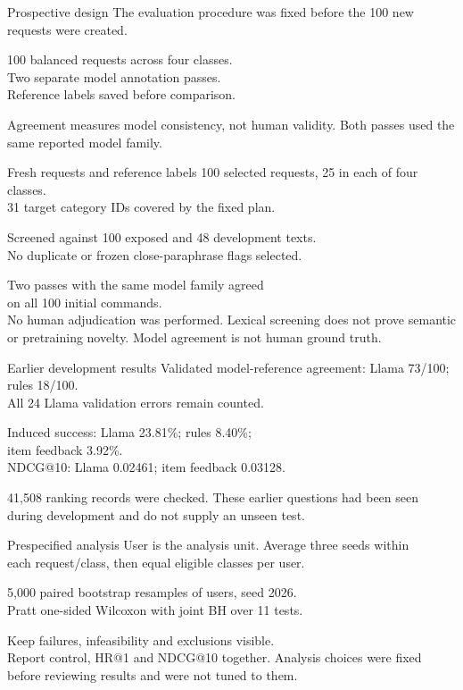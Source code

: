 \documentclass[10pt]{beamer}
\begin{document}
\begin{frame}{Prospective design}
\small
The evaluation procedure was fixed before the 100 new requests were created.

100 balanced requests across four classes.\\
Two separate model annotation passes.\\
Reference labels saved before comparison.

Agreement measures model consistency, not human validity.
\vfill
\tiny Both passes used the same reported model family.
\end{frame}

\begin{frame}{Fresh requests and reference labels}
\small
100 selected requests, 25 in each of four classes.\\
31 target category IDs covered by the fixed plan.

Screened against 100 exposed and 48 development texts.\\
No duplicate or frozen close-paraphrase flags selected.

Two passes with the same model family agreed\\
on all 100 initial commands.\\
No human adjudication was performed.
\vfill
\tiny Lexical screening does not prove semantic or pretraining novelty. Model agreement is not human ground truth.
\end{frame}

\begin{frame}{Earlier development results}
\small
Validated model-reference agreement: Llama 73/100; rules 18/100.\\
All 24 Llama validation errors remain counted.

Induced success: Llama 23.81\%; rules 8.40\%;\\
item feedback 3.92\%.\\
NDCG@10: Llama 0.02461; item feedback 0.03128.

41,508 ranking records were checked.
\vfill
\tiny These earlier questions had been seen during development and do not supply an unseen test.
\end{frame}

\begin{frame}{Prespecified analysis}
\small
User is the analysis unit. Average three seeds within\\
each request/class, then equal eligible classes per user.

5,000 paired bootstrap resamples of users, seed 2026.\\
Pratt one-sided Wilcoxon with joint BH over 11 tests.

Keep failures, infeasibility and exclusions visible.\\
Report control, HR@1 and NDCG@10 together.
\vfill
\tiny Analysis choices were fixed before reviewing results and were not tuned to them.
\end{frame}
\end{document}

